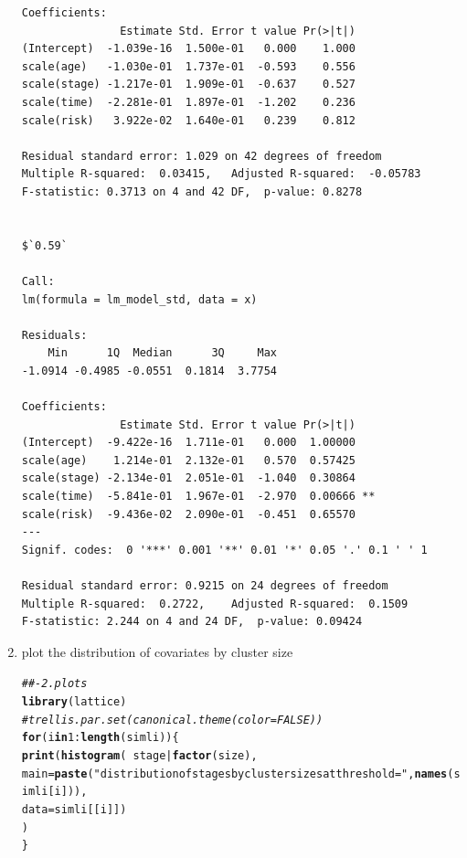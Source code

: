 \documentclass[]{revtex4}\usepackage[]{graphicx}\usepackage[]{color}
\makeatletter
\newcommand{\hlnum}[1]{\textcolor[rgb]{0.686,0.059,0.569}{#1}}%
\newcommand{\hlstr}[1]{\textcolor[rgb]{0.192,0.494,0.8}{#1}}%
\newcommand{\hlcom}[1]{\textcolor[rgb]{0.678,0.584,0.686}{\textit{#1}}}%
\newcommand{\hlopt}[1]{\textcolor[rgb]{0,0,0}{#1}}%
\newcommand{\hlstd}[1]{\textcolor[rgb]{0.345,0.345,0.345}{#1}}%
\newcommand{\hlkwa}[1]{\textcolor[rgb]{0.161,0.373,0.58}{\textbf{#1}}}%
\newcommand{\hlkwc}[1]{\textcolor[rgb]{0.333,0.667,0.333}{#1}}%
\newcommand{\hlkwd}[1]{\textcolor[rgb]{0.737,0.353,0.396}{\textbf{#1}}}%
\newenvironment{kframe}{%
 \def\at@end@of@kframe{}%
 \ifinner\ifhmode%
  \def\at@end@of@kframe{\end{minipage}}%
  \begin{minipage}{\columnwidth}%
 \fi\fi%
 \def\FrameCommand##1{\hskip\@totalleftmargin \hskip-\fboxsep
 \colorbox{shadecolor}{##1}\hskip-\fboxsep
     \hskip-\linewidth \hskip-\@totalleftmargin \hskip\columnwidth}%
 \MakeFramed {\advance\hsize-\width
   \@totalleftmargin\z@ \linewidth\hsize
   \@setminipage}}%
 {\par\unskip\endMakeFramed%
 \at@end@of@kframe}
\newenvironment{knitrout}{}{} %
\makeatother
\begin{document}
\begin{enumerate}
\begin{knitrout}
\begin{kframe}
\begin{verbatim}
Coefficients:
               Estimate Std. Error t value Pr(>|t|)
(Intercept)  -1.039e-16  1.500e-01   0.000    1.000
scale(age)   -1.030e-01  1.737e-01  -0.593    0.556
scale(stage) -1.217e-01  1.909e-01  -0.637    0.527
scale(time)  -2.281e-01  1.897e-01  -1.202    0.236
scale(risk)   3.922e-02  1.640e-01   0.239    0.812

Residual standard error: 1.029 on 42 degrees of freedom
Multiple R-squared:  0.03415,	Adjusted R-squared:  -0.05783 
F-statistic: 0.3713 on 4 and 42 DF,  p-value: 0.8278


$`0.59`

Call:
lm(formula = lm_model_std, data = x)

Residuals:
    Min      1Q  Median      3Q     Max 
-1.0914 -0.4985 -0.0551  0.1814  3.7754 

Coefficients:
               Estimate Std. Error t value Pr(>|t|)   
(Intercept)  -9.422e-16  1.711e-01   0.000  1.00000   
scale(age)    1.214e-01  2.132e-01   0.570  0.57425   
scale(stage) -2.134e-01  2.051e-01  -1.040  0.30864   
scale(time)  -5.841e-01  1.967e-01  -2.970  0.00666 **
scale(risk)  -9.436e-02  2.090e-01  -0.451  0.65570   
---
Signif. codes:  0 '***' 0.001 '**' 0.01 '*' 0.05 '.' 0.1 ' ' 1

Residual standard error: 0.9215 on 24 degrees of freedom
Multiple R-squared:  0.2722,	Adjusted R-squared:  0.1509 
F-statistic: 2.244 on 4 and 24 DF,  p-value: 0.09424
\end{verbatim}
\end{kframe}
\end{knitrout}


\item plot the distribution of covariates by cluster size

\begin{knitrout}
\color{fgcolor}\begin{kframe}
\begin{alltt}
\hlcom{##- 2. plots}
\hlkwd{library}\hlstd{(lattice)}
\hlcom{# trellis.par.set(canonical.theme(color = FALSE))}
\hlkwa{for}\hlstd{(i} \hlkwa{in} \hlnum{1}\hlopt{:}\hlkwd{length}\hlstd{(simli))\{}
  \hlkwd{print}\hlstd{(}\hlkwd{histogram}\hlstd{(}\hlopt{~} \hlstd{stage}\hlopt{|}\hlkwd{factor}\hlstd{(size),}
            \hlkwc{main} \hlstd{=} \hlkwd{paste}\hlstd{(}\hlstr{"distribution of stages by cluster sizes at threshold ="}\hlstd{,} \hlkwd{names}\hlstd{(simli[i])),}
            \hlkwc{data} \hlstd{= simli[[i]])}
  \hlstd{)}
\hlstd{\}}
\end{alltt}
\end{kframe}


\end{knitrout}
\end{enumerate}
\end{document}
